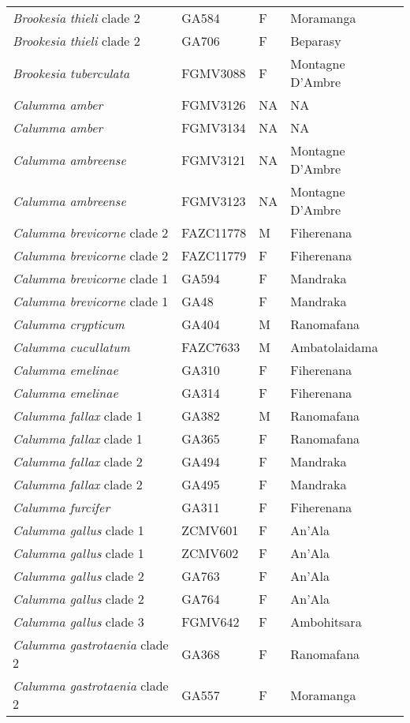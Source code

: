 \begin{longtable}{llll}
\textit{Brookesia thieli} clade 2 & GA584 & F & Moramanga\\
\textit{Brookesia thieli} clade 2 & GA706 & F & Beparasy\\
\textit{Brookesia tuberculata} & FGMV3088 & F & Montagne D'Ambre\\
\hline
\textit{Calumma amber} & FGMV3126 & NA & NA\\
\textit{Calumma amber} & FGMV3134 & NA & NA\\
\textit{Calumma ambreense} & FGMV3121 & NA & Montagne D'Ambre\\
\textit{Calumma ambreense} & FGMV3123 & NA & Montagne D'Ambre\\
\textit{Calumma brevicorne} clade 2 & FAZC11778 & M & Fiherenana\\
\textit{Calumma brevicorne} clade 2 & FAZC11779 & F & Fiherenana\\
\textit{Calumma brevicorne} clade 1 & GA594 & F & Mandraka\\
\textit{Calumma brevicorne} clade 1 & GA48 & F & Mandraka\\
\textit{Calumma crypticum} & GA404 & M & Ranomafana\\
\textit{Calumma cucullatum} & FAZC7633 & M & Ambatolaidama\\
\textit{Calumma emelinae} & GA310 & F & Fiherenana\\
\textit{Calumma emelinae} & GA314 & F & Fiherenana\\
\textit{Calumma fallax} clade 1 & GA382 & M & Ranomafana\\
\textit{Calumma fallax} clade 1 & GA365 & F & Ranomafana\\
\textit{Calumma fallax} clade 2 & GA494 & F & Mandraka\\
\textit{Calumma fallax} clade 2 & GA495 & F & Mandraka\\
\textit{Calumma furcifer} & GA311 & F & Fiherenana\\
\textit{Calumma gallus} clade 1 & ZCMV601 & F & An'Ala\\
\textit{Calumma gallus} clade 1 & ZCMV602 & F & An'Ala\\
\textit{Calumma gallus} clade 2 & GA763 & F & An'Ala\\
\textit{Calumma gallus} clade 2 & GA764 & F & An'Ala\\
\textit{Calumma gallus} clade 3 & FGMV642 & F & Ambohitsara\\
\textit{Calumma gastrotaenia} clade 2 & GA368 & F & Ranomafana\\
\textit{Calumma gastrotaenia} clade 2 & GA557 & F & Moramanga\\

\end{longtable}

